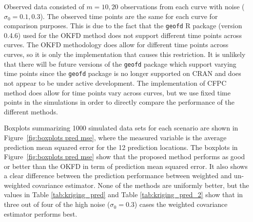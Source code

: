 Observed data consisted of $m = 10, 20$ observations from each curve with noise ($\sigma_0=0.1, 0.3$). The observed time points are the same for each curve for comparison purposes. This is due to the fact that the \texttt{geofd} R package (version 0.4.6) used for the OKFD method does not support different time points across curves. The OKFD methodology does allow for different time points across curves, so it is only the implementation that causes this restriction. It is unlikely that there will be future versions of the \texttt{geofd} package which support varying time points since the \texttt{geofd} package is no longer supported on CRAN and does not appear to be under active development. The implementation of CFPC method does allow for time points vary across curves, but we use fixed time points in the simulations in order to directly compare the performance of the different methods.                                              

Boxplots summarizing 1000 simulated data sets for each scenario are shown in Figure~\ref{fig:boxplots pred mse}, where the measured variable is the average prediction mean squared error for the 12 prediction locations. The boxplots in Figure~\ref{fig:boxplots pred mse} show that the proposed method performs as good or better than the OKFD in term of prediction mean squared error. It also shows a clear difference between the prediction performance between weighted and un-weighted covariance estimator. None of the methods are uniformly better, but the values in Table \ref{tab:kriging_pred} and Table \ref{tab:kriging_pred_2} show that in three out of four of the high noise ($\sigma_0 = 0.3$) cases the weighted covariance estimator performs best.  
 
